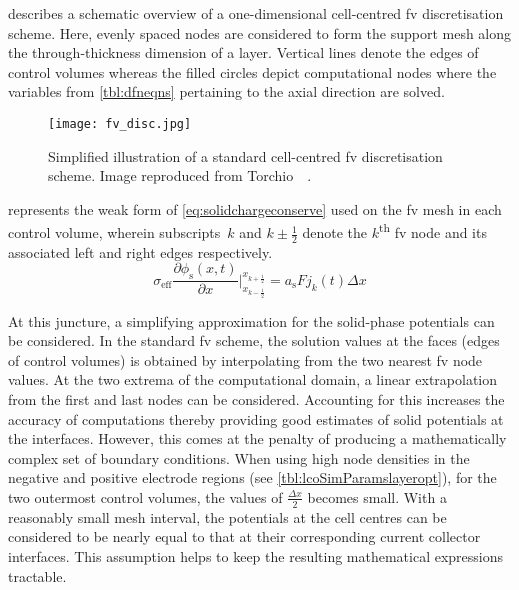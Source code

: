   describes  a  schematic  overview  of  a  one-dimensional
cell-centred  \gls{fv}  discretisation scheme.  Here,  evenly  spaced nodes  are
considered to form  the support mesh along the through-thickness  dimension of a
layer. Vertical  lines denote the  edges of  control volumes whereas  the filled
circles depict  computational nodes where the  variables from \cref{tbl:dfneqns}
pertaining to the axial direction are solved.

\begin{figure}[!htbp]
    \centering
    \texttt{[image: fv\_disc.jpg]}
    \caption[Illustration of a standard cell-centred \gls{fv} discretisation
    scheme]{Simplified illustration of a standard cell-centred \gls{fv}
    discretisation scheme. Image reproduced from
Torchio~\etal~\cite{Torchio2016}.}
    \label{fig:1d_fv_mesh}
\end{figure}

      represents       the      weak       form      of
\cref{eq:solidchargeconserve} used on the \gls{fv}  mesh in each control volume,
wherein subscripts~$k$ and  $k\pm\frac{1}{2}$ denote the $k$\textsuperscript{th}
\gls{fv} node and its associated left and right edges respectively.
\begin{equation} \label{eq:discretisedPhiS}
    \sigma_{\text{eff}} \frac{\partial \phi_\text{s}(x,t)}{\partial x}\Bigg|_{x_{k-\frac{1}{2}}}^{x_{k+\frac{1}{2}}} = a_\text{s} F j_k(t) \Delta x
\end{equation}

At this juncture, a simplifying approximation for the solid-phase potentials can
be considered. In the standard \gls{fv} scheme, the solution values at the faces
(edges of  control volumes) is  obtained by  interpolating from the  two nearest
\gls{fv} node values.  At the two extrema of the  computational domain, a linear
extrapolation from  the first and last  nodes can be considered.  Accounting for
this increases the accuracy of  computations thereby providing good estimates of
solid  potentials at  the  interfaces. However,  this comes  at  the penalty  of
producing  a  mathematically complex  set  of  boundary conditions.  When  using
high  node  densities  in  the  negative and  positive  electrode  regions  (see
\cref{tbl:lcoSimParamslayeropt}),  for the  two outermost  control volumes,  the
values  of $\frac{\Delta  x}{2}$ becomes  small.  With a  reasonably small  mesh
interval, the  potentials at  the cell  centres can be  considered to  be nearly
equal  to  that  at  their  corresponding  current  collector  interfaces.  This
assumption helps to keep the resulting mathematical expressions tractable.

